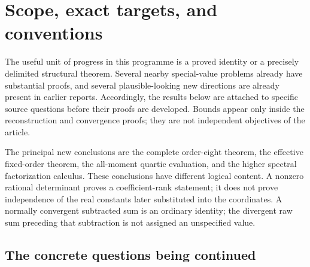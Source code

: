 \documentclass[11pt,a4paper]{article}
\numberwithin{equation}{section}
\theoremstyle{plain}
\theoremstyle{definition}
\theoremstyle{remark}
\begin{document}
\section{Scope, exact targets, and conventions}
\label{sec:scope}

The useful unit of progress in this programme is a proved identity or a
precisely delimited structural theorem.  Several nearby special-value
problems already have substantial proofs, and several plausible-looking
new directions are already present in earlier reports.  Accordingly,
the results below are attached to specific source questions before their
proofs are developed.  Bounds appear only inside the reconstruction and
convergence proofs; they are not independent objectives of the article.

The principal new conclusions are the complete order-eight theorem,
the effective fixed-order theorem, the all-moment quartic evaluation,
and the higher spectral factorization calculus.  These conclusions have
different logical content.  A nonzero rational determinant proves a
coefficient-rank statement; it does not prove independence of the real
constants later substituted into the coordinates.  A normally convergent
subtracted sum is an ordinary identity; the divergent raw sum preceding
that subtraction is not assigned an unspecified value.

\subsection{The concrete questions being continued}
\end{document}
